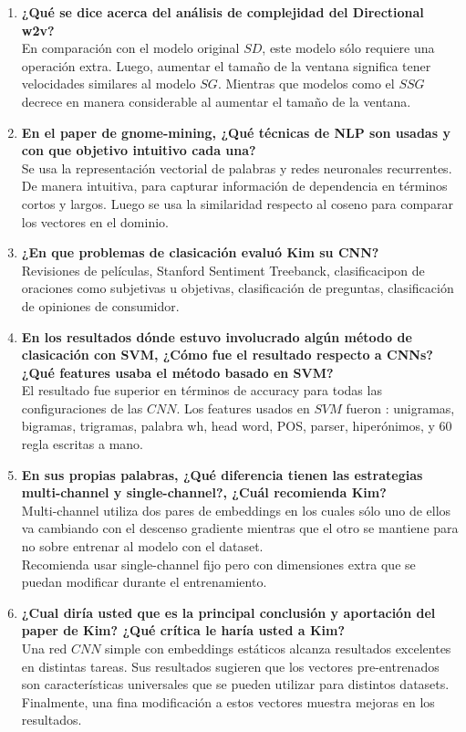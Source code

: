 \documentclass[11pt,letterpaper]{article}
\theoremstyle{definition}
\theoremstyle{definition}
\theoremstyle{definition}
\begin{document}
\begin{enumerate}
	\item \textbf{¿Qué se dice acerca del análisis de complejidad del Directional w2v?}
	\\
	En comparación con el modelo original $ SD $, este modelo sólo requiere una operación extra. Luego, aumentar el tamaño de la ventana significa tener velocidades similares al modelo $ SG $. Mientras que modelos como el $ SSG $ decrece en manera considerable al aumentar el tamaño de la ventana.
	\item \textbf{En el paper de gnome-mining, ¿Qué técnicas de NLP son usadas y con que objetivo intuitivo cada una?}
	\\
	Se usa la representación vectorial de palabras y redes neuronales recurrentes. De manera intuitiva, para capturar información de dependencia en términos cortos y largos. Luego se usa la similaridad respecto al coseno para comparar los vectores en el dominio.
	\item \textbf{¿En que problemas de clasicación evaluó Kim su CNN?}
	\\
	Revisiones de películas, Stanford Sentiment Treebanck, clasificacipon de oraciones como subjetivas u objetivas, clasificación de preguntas, clasificación de opiniones de consumidor.	
	\item \textbf{En los resultados dónde estuvo involucrado algún método de clasicación con SVM, ¿Cómo fue el resultado respecto a CNNs? ¿Qué features usaba el método basado en SVM?}
	\\
	El resultado fue superior en términos de accuracy para todas las configuraciones de las $ CNN $. Los features usados en $ SVM $ fueron : unigramas, bigramas, trigramas, palabra wh, head word, POS, parser, hiperónimos, y $ 60 $ regla escritas a mano.
	\item \textbf{En sus propias palabras, ¿Qué diferencia tienen las estrategias multi-channel y single-channel?, ¿Cuál recomienda Kim?}
	\\
	Multi-channel utiliza dos pares de embeddings en los cuales sólo uno de ellos va cambiando con el descenso gradiente mientras que el otro se mantiene para no sobre entrenar al modelo con el dataset. 
	\\
	Recomienda usar single-channel fijo pero con dimensiones extra que se puedan modificar durante el entrenamiento.
	\item \textbf{¿Cual diría usted que es la principal conclusión y aportación del paper de Kim? ¿Qué crítica le haría usted a Kim? }		
	\\
	Una red $ CNN $ simple con embeddings estáticos alcanza resultados excelentes en distintas tareas. Sus resultados sugieren que los vectores pre-entrenados son características universales que se pueden utilizar para distintos datasets. Finalmente, una fina modificación a estos vectores muestra mejoras en los resultados.
\end{enumerate}
\end{document}
